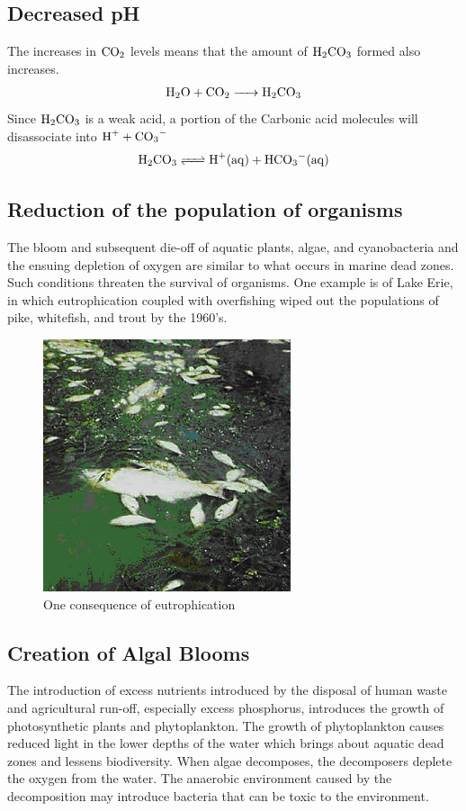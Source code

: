 \documentclass{article}
\begin{document}
    \subsection{Decreased pH}
    The increases in $\ce{CO2}$ levels means that the amount of $\ce{H2CO3}$ formed also increases.
    \begin{align}
        \ce{H2O + CO2 -> H2CO3}
    \end{align}
    Since $\ce{H2CO3}$ is a weak acid, a portion of the Carbonic acid molecules will disassociate into $\ce{H+ + CO3-}$
    \begin{align}
        \ce{H2CO3 <=> H+(aq) + HCO3-(aq)}
    \end{align}
    \subsection{Reduction of the population of organisms}
    The bloom and subsequent die-off of aquatic plants, algae, and cyanobacteria and the ensuing depletion of oxygen are similar to what occurs in marine dead zones.
    Such conditions threaten the survival of organisms. One example is of Lake Erie, in which eutrophication coupled with overfishing wiped out the populations of pike, whitefish, and trout by the 1960's\cite{bio}.
        \begin{figure}[h]
            \centering
            \includegraphics{deadfish}
            \caption{One consequence of eutrophication}
            \label{fig:deadfish}
        \end{figure}
    \subsection{Creation of Algal Blooms}
        The introduction of excess nutrients introduced by the disposal of human waste and agricultural run-off, especially excess phosphorus, introduces the growth of photosynthetic plants and phytoplankton.
        The growth of phytoplankton causes reduced light in the lower depths of the water which brings about aquatic dead zones and lessens biodiversity. When algae decomposes, the decomposers deplete the oxygen from the water.
        The anaerobic environment caused by the decomposition may introduce bacteria that can be toxic to the environment.\cite{china}
\newpage
\printbibliography[heading=bibintoc]
\end{document}
